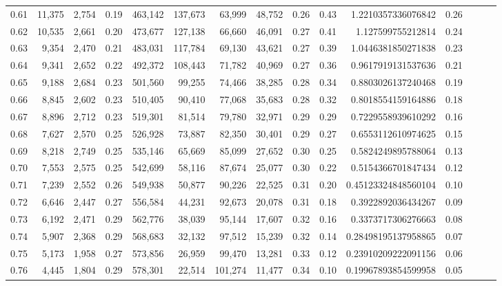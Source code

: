 \begin{tabular}{rrrrrrrrrrrrrrr}
0.61 &  11,375 &  2,754 &  0.19 &  463,142 &  137,673 &   63,999 &   48,752 &  0.26 &  0.43 &      1.2210357336076842 &      0.26 \\
0.62 &  10,535 &  2,661 &  0.20 &  473,677 &  127,138 &   66,660 &   46,091 &  0.27 &  0.41 &       1.127599755212814 &      0.24 \\
0.63 &   9,354 &  2,470 &  0.21 &  483,031 &  117,784 &   69,130 &   43,621 &  0.27 &  0.39 &      1.0446381850271838 &      0.23 \\
0.64 &   9,341 &  2,652 &  0.22 &  492,372 &  108,443 &   71,782 &   40,969 &  0.27 &  0.36 &      0.9617919131537636 &      0.21 \\
0.65 &   9,188 &  2,684 &  0.23 &  501,560 &   99,255 &   74,466 &   38,285 &  0.28 &  0.34 &      0.8803026137240468 &      0.19 \\
0.66 &   8,845 &  2,602 &  0.23 &  510,405 &   90,410 &   77,068 &   35,683 &  0.28 &  0.32 &      0.8018554159164886 &      0.18 \\
0.67 &   8,896 &  2,712 &  0.23 &  519,301 &   81,514 &   79,780 &   32,971 &  0.29 &  0.29 &      0.7229558939610292 &      0.16 \\
0.68 &   7,627 &  2,570 &  0.25 &  526,928 &   73,887 &   82,350 &   30,401 &  0.29 &  0.27 &      0.6553112610974625 &      0.15 \\
0.69 &   8,218 &  2,749 &  0.25 &  535,146 &   65,669 &   85,099 &   27,652 &  0.30 &  0.25 &      0.5824249895788064 &      0.13 \\
0.70 &   7,553 &  2,575 &  0.25 &  542,699 &   58,116 &   87,674 &   25,077 &  0.30 &  0.22 &      0.5154366701847434 &      0.12 \\
0.71 &   7,239 &  2,552 &  0.26 &  549,938 &   50,877 &   90,226 &   22,525 &  0.31 &  0.20 &     0.45123324848560104 &      0.10 \\
0.72 &   6,646 &  2,447 &  0.27 &  556,584 &   44,231 &   92,673 &   20,078 &  0.31 &  0.18 &      0.3922892036434267 &      0.09 \\
0.73 &   6,192 &  2,471 &  0.29 &  562,776 &   38,039 &   95,144 &   17,607 &  0.32 &  0.16 &      0.3373717306276663 &      0.08 \\
0.74 &   5,907 &  2,368 &  0.29 &  568,683 &   32,132 &   97,512 &   15,239 &  0.32 &  0.14 &     0.28498195137958865 &      0.07 \\
0.75 &   5,173 &  1,958 &  0.27 &  573,856 &   26,959 &   99,470 &   13,281 &  0.33 &  0.12 &     0.23910209222091156 &      0.06 \\
0.76 &   4,445 &  1,804 &  0.29 &  578,301 &   22,514 &  101,274 &   11,477 &  0.34 &  0.10 &     0.19967893854599958 &      0.05 \\

\end{tabular}
